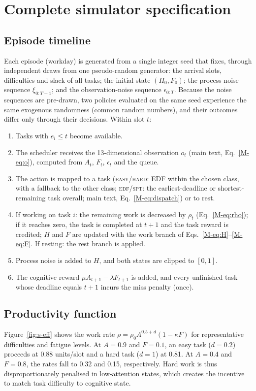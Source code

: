 \section{Complete simulator specification}\label{sec:s-spec}

\subsection{Episode timeline}
Each episode (workday) is generated from a single integer seed that fixes, through independent draws from one pseudo-random generator: the arrival slots, difficulties and slack of all tasks; the initial state $(H_0,F_0)$; the process-noise sequence $\xi_{0:T-1}$; and the observation-noise sequence $\epsilon_{0:T}$. Because the noise sequences are pre-drawn, two policies evaluated on the same seed experience the same exogenous randomness (common random numbers), and their outcomes differ only through their decisions. Within slot $t$:
\begin{enumerate}[label=\arabic*.]
\item Tasks with $e_i\le t$ become available.
\item The scheduler receives the 13-dimensional observation $o_t$ (main text, Eq.~\eqref{M-eq:o}), computed from $A_t$, $F_t$, $\epsilon_t$ and the queue.
\item The action is mapped to a task (\textsc{easy}/\textsc{hard}: EDF within the chosen class, with a fallback to the other class; \textsc{edf}/\textsc{spt}: the earliest-deadline or shortest-remaining task overall; main text, Eq.~\eqref{M-eq:dispatch}) or to rest.
\item If working on task $i$: the remaining work is decreased by $\rho_t$ (Eq.~\eqref{M-eq:rho}); if it reaches zero, the task is completed at $t+1$ and the task reward is credited; $H$ and $F$ are updated with the work branch of Eqs.~\eqref{M-eq:H}--\eqref{M-eq:F}. If resting: the rest branch is applied.
\item Process noise is added to $H$, and both states are clipped to $[0,1]$.
\item The cognitive reward $\mu A_{t+1}-\lambda F_{t+1}$ is added, and every unfinished task whose deadline equals $t+1$ incurs the miss penalty (once).
\end{enumerate}

\subsection{Productivity function}
Figure~\ref{fig:s-eff} shows the work rate $\rho=\rho_0A^{0.5+d}(1-\kappa F)$ for representative difficulties and fatigue levels. At $A=0.9$ and $F=0.1$, an easy task ($d=0.2$) proceeds at 0.88 units/slot and a hard task ($d=1$) at 0.81. At $A=0.4$ and $F=0.8$, the rates fall to 0.32 and 0.15, respectively. Hard work is thus disproportionately penalised in low-attention states, which creates the incentive to match task difficulty to cognitive state.

